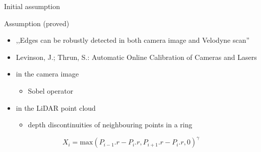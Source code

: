 \documentclass[pdf]{beamer}
\begin{document}
	\begin{frame}{Initial assumption}
		\begin{alertblock}{Assumption (proved)}
		\begin{itemize}
			\item ,,Edges can be robustly detected in both camera image and Velodyne scan''
			\item \scriptsize{Levinson, J.; Thrun, S.: Automatic Online Calibration of Cameras and Lasers}
		\end{itemize}
		\end{alertblock}
		
		\begin{itemize}
			\item in the camera image
			\begin{itemize}
				\item Sobel operator
			\end{itemize}
			\item in the LiDAR point cloud
			\begin{itemize}
			 	\item depth discontinuities of neighbouring points in a ring
			\end{itemize}
		\end{itemize}
			\begin{equation}
				X_i = \mbox{max}(P_{i-1}.r - P_i.r, P_{i+1}.r - P_i.r, 0)^\gamma
			\end{equation}
	\end{frame}
\end{document}
